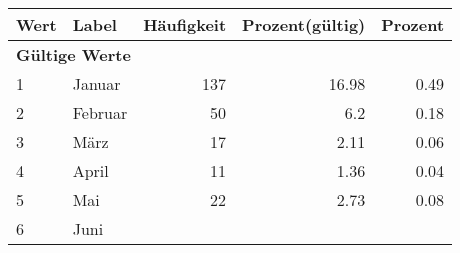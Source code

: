      \begin{longtable}{lXrrr}
     \toprule
     \textbf{Wert} & \textbf{Label} & \textbf{Häufigkeit} & \textbf{Prozent(gültig)} & \textbf{Prozent} \\
     \endhead
     \midrule
     \multicolumn{5}{l}{\textbf{Gültige Werte}}\\

     1 &
     \multicolumn{1}{X}{ Januar   } &


       \num{137} &
       \num[round-mode=places,round-precision=2]{16,98} &
         \num[round-mode=places,round-precision=2]{0,49} \\

     2 &
     \multicolumn{1}{X}{ Februar   } &


       \num{50} &
       \num[round-mode=places,round-precision=2]{6,2} &
         \num[round-mode=places,round-precision=2]{0,18} \\

     3 &
     \multicolumn{1}{X}{ März   } &


       \num{17} &
       \num[round-mode=places,round-precision=2]{2,11} &
         \num[round-mode=places,round-precision=2]{0,06} \\

     4 &
     \multicolumn{1}{X}{ April   } &


       \num{11} &
       \num[round-mode=places,round-precision=2]{1,36} &
         \num[round-mode=places,round-precision=2]{0,04} \\

     5 &
     \multicolumn{1}{X}{ Mai   } &


       \num{22} &
       \num[round-mode=places,round-precision=2]{2,73} &
         \num[round-mode=places,round-precision=2]{0,08} \\

     6 &
     \multicolumn{1}{X}{ Juni   } &



\end{longtable}
